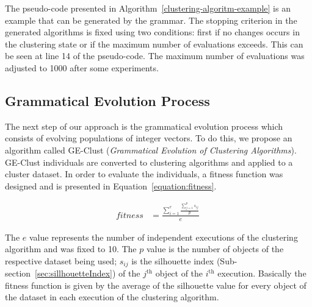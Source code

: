 \documentclass[conference,compsoc]{IEEEtran}
\begin{document}
The pseudo-code presented in Algorithm~\ref{clustering-algoritm-example} is an example that can be generated by the grammar. The stopping criterion in the generated algorithms is fixed using two conditions: first if no changes occurs in the clustering state or if the maximum number of evaluations exceeds. This can be seen at line 14 of the pseudo-code. The maximum number of evaluations was adjusted to 1000 after some experiments.


\subsection{Grammatical Evolution Process}

The next step of our approach is the grammatical evolution process which consists of evolving populations of integer vectors. To do this, we propose an algorithm called GE-Clust ({\it Grammatical Evolution of Clustering Algorithms}). GE-Clust individuals are converted to clustering algorithms and applied to a cluster dataset. In order to evaluate the individuals, a fitness function was designed and is presented in Equation~\ref{equation:fitness}.

\begin{align}
\label{equation:fitness}
fitness    &= \frac{\sum_{i=1}^e \frac{\sum_{j=1}^{p} s_{ij}}{p}}{e}
\
\end{align}

The $e$ value represents the number of independent executions of the clustering algorithm and was fixed to 10. The $p$ value is the number of objects of the respective dataset being used; $s_{ij}$ is the silhouette index (Sub-section~\ref{sec:sillhouetteIndex}) of the $j^{\text{th}}$ object of the $i^{\text{th}}$ execution. Basically the fitness function is given by the average of the silhouette value for every object of the dataset in each execution of the clustering algorithm.

\end{document}
